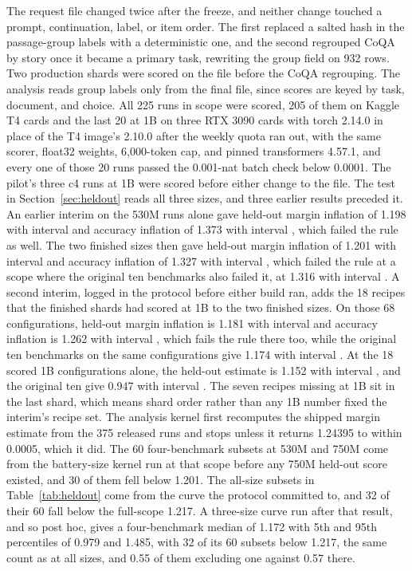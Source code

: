 The request file changed twice after the freeze, and neither change touched a prompt, continuation, label, or item order. The first replaced a salted hash in the passage-group labels with a deterministic one, and the second regrouped CoQA by story once it became a primary task, rewriting the group field on 932 rows. Two production shards were scored on the file before the CoQA regrouping. The analysis reads group labels only from the final file, since scores are keyed by task, document, and choice. All 225 runs in scope were scored, 205 of them on Kaggle T4 cards and the last 20 at 1B on three RTX 3090 cards with torch 2.14.0 in place of the T4 image's 2.10.0 after the weekly quota ran out, with the same scorer, float32 weights, 6,000-token cap, and pinned transformers 4.57.1, and every one of those 20 runs passed the 0.001-nat batch check below 0.0001. The pilot's three c4 runs at 1B were scored before either change to the file. The test in Section~\ref{sec:heldout} reads all three sizes, and three earlier results preceded it. An earlier interim on the 530M runs alone gave held-out margin inflation of 1.198 with interval  and accuracy inflation of 1.373 with interval , which failed the rule as well. The two finished sizes then gave held-out margin inflation of 1.201 with interval  and accuracy inflation of 1.327 with interval , which failed the rule at a scope where the original ten benchmarks also failed it, at 1.316 with interval . A second interim, logged in the protocol before either build ran, adds the 18 recipes that the finished shards had scored at 1B to the two finished sizes. On those 68 configurations, held-out margin inflation is 1.181 with interval  and accuracy inflation is 1.262 with interval , which fails the rule there too, while the original ten benchmarks on the same configurations give 1.174 with interval . At the 18 scored 1B configurations alone, the held-out estimate is 1.152 with interval , and the original ten give 0.947 with interval . The seven recipes missing at 1B sit in the last shard, which means shard order rather than any 1B number fixed the interim's recipe set. The analysis kernel first recomputes the shipped margin estimate from the 375 released runs and stops unless it returns 1.24395 to within 0.0005, which it did. The 60 four-benchmark subsets at 530M and 750M come from the battery-size kernel run at that scope before any 750M held-out score existed, and 30 of them fell below 1.201. The all-size subsets in Table~\ref{tab:heldout} come from the curve the protocol committed to, and 32 of their 60 fall below the full-scope 1.217. A three-size curve run after that result, and so post hoc, gives a four-benchmark median of 1.172 with 5th and 95th percentiles of 0.979 and 1.485, with 32 of its 60 subsets below 1.217, the same count as at all sizes, and 0.55 of them excluding one against 0.57 there.

